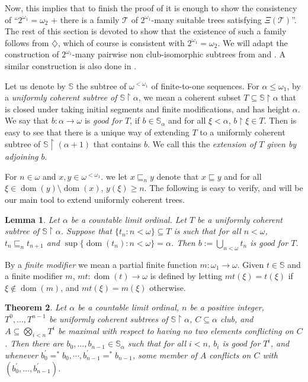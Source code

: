 \documentclass[10pt,a4paper]{amsart}
\newtheorem{theorem}{Theorem}[section]
\newtheorem{lemma}[theorem]{Lemma}
\theoremstyle{definition}
\newcommand{\seb}{\subseteq}
\newcommand{\setm}{\setminus}
\newcommand{\tleq}{\sqsubseteq}
\newcommand{\res}{\!\upharpoonright\!}
\newcommand{\1}{\mathbf{1}}
\newcommand{\dia}{\diamondsuit}
\newcommand{\T}{\mathcal{T}}
\newcommand{\prop}{\Xi}
\renewcommand{\S}{\mathbb{S}}
\DeclareMathOperator{\dom}{dom}
\begin{document}
Now, this implies that
to finish the proof of  it is enough to
show the consistency of ``$2^{\omega_{1}} = \omega_{2}$
+ there is a family $\T$ of $2^{\omega_{1}}$-many suitable trees
satisfying $\prop(\T)$''. The rest of this section is devoted to show that
the existence of such a family follows from
$\dia$, which of course is consistent with $2^{\omega_{1}} = \omega_{2}$.
We will adapt the construction
of $2^{\omega_{1}}$-many pairwise non club-isomorphic subtrees from
\cite{ShelahAbraham} and \cite{MartinezThesis}. A similar construction
is also done in \cite{ChavezKrueger}. 


Let us denote by $\S$ the subtree of $\omega^{<\omega_{1}}$ of finite-to-one
sequences.
For $\alpha \le \omega_{1}$, by a \emph{uniformly
  coherent subtree of $\S\res \alpha$},
we mean a coherent subset $T \seb \S\res\alpha$ that is closed under
taking initial segments and finite modifications,
and has height $\alpha$. We say that $b : \alpha \to \omega$
is \emph{good for $T$}, if $b \in \S_{\alpha}$ and
for all $\xi < \alpha$, $b\res \xi \in T$. Then
is easy to see
that there is a unique way of extending $T$ to
a uniformly coherent subtree of $\S \res (\alpha+1)$ that contains
$b$. We call this the \emph{extension of $T$ given by adjoining $b$}.

For $n \in \omega$ and $x,y \in \omega^{<\omega_{1}}$.
we let $x \tleq_{n} y$ denote that $x \tleq y$ and for all $\xi \in
\dom(y)\setm\dom(x)$, $y(\xi) \ge n$.
The following is easy to verify, and will be our main tool to extend
uniformly coherent trees.

\begin{lemma}\label{lem:fund-ext}
  Let $\alpha$ be a countable limit ordinal. Let $T$ be a uniformly
  coherent subtree of $\S \res \alpha$. Suppose that
  $\{t_{n} : n < \omega\} \seb T$ is such that for all $n < \omega$,
  $t_{n} \tleq_{n} t_{n+1}$ and
  $\sup\{\dom(t_{n}) : n < \omega\} = \alpha$. Then
  $b := \bigcup_{n < \omega}t_{n}$ is good for $T$.
\end{lemma}

By a \emph{finite modifier} we mean a partial finite function
$m : \omega_{1} \to \omega$. Given $t \in \S$ and a finite modifier
$m$, $mt : \dom(t) \to \omega$ is defined by letting
$mt(\xi) = t(\xi)$ if $\xi \notin \dom(m)$, and
$mt(\xi) = m(\xi)$ otherwise.

\begin{theorem}\label{lem:hard-ext}
  Let $\alpha$ be a countable limit ordinal,
  $n$ be a positive integer, $T^{0},\dots,T^{n-1}$ be uniformly coherent
  subtrees of $\S \res \alpha$, $C \seb \alpha$ club,
  and $A \seb \bigotimes_{i < n}T^{i}$ be maximal with respect
  to having no two elements conflicting on $C$. Then there are
  $b_{0},\dots,b_{n-1} \in \S_{\alpha}$ such that
  for all $i < n$, $b_{i}$ is good for $T^{i}$,
  and whenever
  $b^{'}_{0} =^{*} b_{0}, \cdots, b^{'}_{n-1} =^{*} b_{n-1}$, some member
  of $A$ conflicts on $C$ with
  $(b_{0}^{'},\dots,b_{n-1}^{'})$.
\end{theorem}
\end{document}
